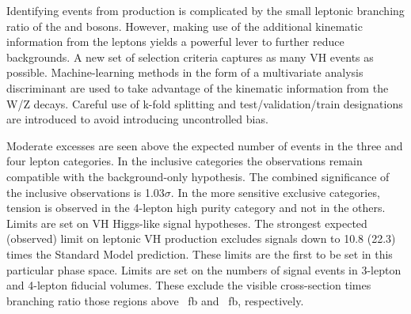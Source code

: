 Identifying events from \vhmm production is complicated by the small leptonic branching ratio of the \W and \Z bosons.
However, making use of the additional kinematic information from the leptons yields a powerful lever to further reduce backgrounds.
A new set of selection criteria captures as many VH events as possible.
Machine-learning methods in the form of a multivariate analysis discriminant are used to take advantage of the kinematic information from the W/Z decays.
Careful use of k-fold splitting and test/validation/train designations are introduced to avoid introducing uncontrolled bias.

Moderate excesses are seen above the expected number of events in the three and four lepton categories.
In the inclusive categories the observations remain compatible with the background-only hypothesis.
The combined significance of the inclusive observations is 1.03$\sigma$.
In the more sensitive exclusive categories, tension is observed in the 4-lepton high purity category and not in the others.
Limits are set on VH Higgs-like signal hypotheses.
The strongest expected (observed) limit on leptonic VH production excludes signals down to 10.8 (22.3) times the Standard Model prediction.
These limits are the first to be set in this particular phase space.
Limits are set on the numbers of signal events in 3-lepton and 4-lepton fiducial volumes.
These exclude the visible cross-section times branching ratio those regions above ~fb and ~fb, respectively.
